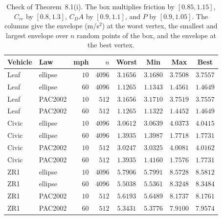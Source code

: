 \documentclass[12pt, twoside]{amsart}
\theoremstyle{definition}
\newcommand{\mainref}[2]{#2}
\begin{document}
\begin{table}[htbp]
\centering\small
\caption{Check of Theorem~\mainref{thm:propagation}{8.1}\mainref{pr:box}{{(i)}}. The box multiplies friction by $[0.85,1.15]$, $C_{rr}$ by $[0.8,1.3]$, $C_DA$ by $[0.9,1.1]$, and $P$ by $[0.9,1.05]$. The columns give the envelope (m/s$^2$) at the worst vertex, the smallest and largest envelope over $n$ random points of the box, and the envelope at the best vertex.}\label{tab:app-box}
\begin{tabular}{llrrcccc}
\toprule
Vehicle & Law & mph & $n$ & Worst & Min & Max & Best\\
\midrule
Leaf & ellipse & $10$ & $4096$ & $3.1656$ & $3.1680$ & $3.7508$ & $3.7557$\\
Leaf & ellipse & $60$ & $4096$ & $1.1265$ & $1.1343$ & $1.4561$ & $1.4649$\\
Leaf & PAC2002 & $10$ & $512$ & $3.1656$ & $3.1710$ & $3.7519$ & $3.7557$\\
Leaf & PAC2002 & $60$ & $512$ & $1.1265$ & $1.1322$ & $1.4452$ & $1.4649$\\
Civic & ellipse & $10$ & $4096$ & $3.0612$ & $3.0639$ & $4.0373$ & $4.0415$\\
Civic & ellipse & $60$ & $4096$ & $1.3935$ & $1.3987$ & $1.7718$ & $1.7731$\\
Civic & PAC2002 & $10$ & $512$ & $3.0247$ & $3.0325$ & $4.0081$ & $4.0162$\\
Civic & PAC2002 & $60$ & $512$ & $1.3935$ & $1.4160$ & $1.7576$ & $1.7731$\\
ZR1 & ellipse & $10$ & $4096$ & $5.7906$ & $5.7991$ & $8.5728$ & $8.5812$\\
ZR1 & ellipse & $60$ & $4096$ & $5.5038$ & $5.5361$ & $8.3248$ & $8.3484$\\
ZR1 & PAC2002 & $10$ & $512$ & $5.6193$ & $5.6489$ & $8.1737$ & $8.1761$\\
ZR1 & PAC2002 & $60$ & $512$ & $5.3431$ & $5.3776$ & $7.9100$ & $7.9574$\\
\bottomrule
\end{tabular}
\end{table}
\end{document}
